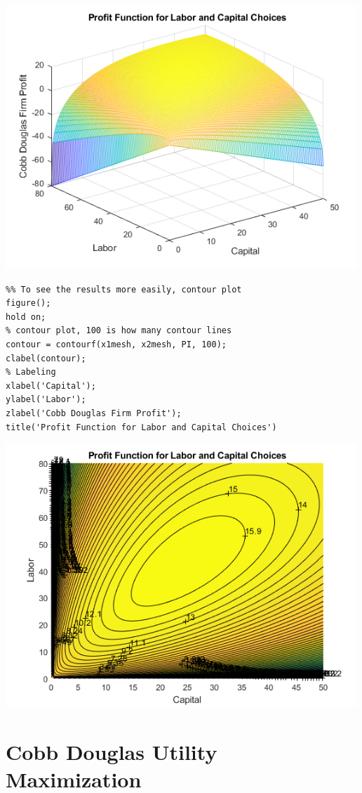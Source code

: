\documentclass[
]{book}
\begin{document}
\includegraphics[width=5.20833in,height=\textheight]{img/KL_borrowhire_firm_images/figure_0.png}

\begin{verbatim}
%% To see the results more easily, contour plot
figure();
hold on;
% contour plot, 100 is how many contour lines
contour = contourf(x1mesh, x2mesh, PI, 100);
clabel(contour);
% Labeling
xlabel('Capital');
ylabel('Labor');
zlabel('Cobb Douglas Firm Profit');
title('Profit Function for Labor and Capital Choices')
\end{verbatim}

\includegraphics[width=5.20833in,height=\textheight]{img/KL_borrowhire_firm_images/figure_1.png}

\hypertarget{cobb-douglas-utility-maximization}{%
\section{Cobb Douglas Utility Maximization}\label{cobb-douglas-utility-maximization}}
\end{document}
